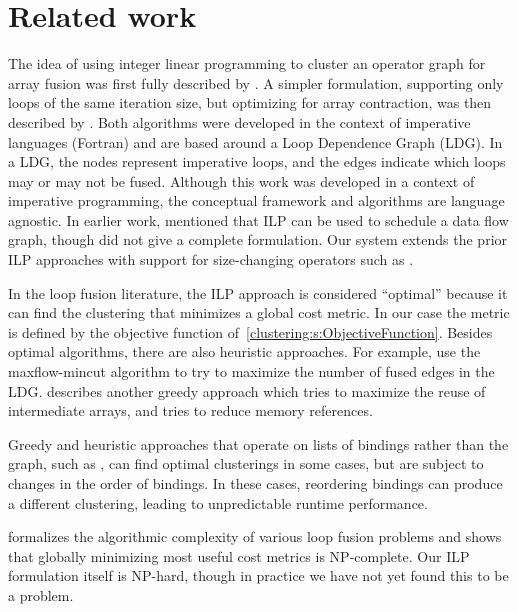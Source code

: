 \section{Related work}
The idea of using integer linear programming to cluster an operator graph for array fusion was first fully described by \citet{megiddo1998optimal}.
A simpler formulation, supporting only loops of the same iteration size, but optimizing for array contraction, was then described by \citet{darte2002contraction}.
Both algorithms were developed in the context of imperative languages (Fortran) and are based around a Loop Dependence Graph (LDG).
In a LDG, the nodes represent imperative loops, and the edges indicate which loops may or may not be fused.
Although this work was developed in a context of imperative programming, the conceptual framework and algorithms are language agnostic.
In earlier work, \citet{chatterjee1993nested} mentioned that ILP can be used to schedule a data flow graph, though did not give a complete formulation.
Our system extends the prior ILP approaches with support for size-changing operators such as \Hs@filter@.

In the loop fusion literature, the ILP approach is considered ``optimal'' because it can find the clustering that minimizes a global cost metric.
In our case the metric is defined by the objective function of~\cref{clustering:s:ObjectiveFunction}.
Besides optimal algorithms, there are also heuristic approaches.
For example, \citet{gao1993collective} use the maxflow-mincut algorithm to try to maximize the number of fused edges in the LDG.
\citet{kennedy2001fastgreedy} describes another greedy approach which tries to maximize the reuse of intermediate arrays, and \citet{song2004improving} tries to reduce memory references.

Greedy and heuristic approaches that operate on lists of bindings rather than the graph, such as \citet{rompf2013optimizing}, can find optimal clusterings in some cases, but are subject to changes in the order of bindings.
In these cases, reordering bindings can produce a different clustering, leading to unpredictable runtime performance.

\citet{darte1999complexity} formalizes the algorithmic complexity of various loop fusion problems and shows that globally minimizing most useful cost metrics is NP-complete.
Our ILP formulation itself is NP-hard, though in practice we have not yet found this to be a problem.

